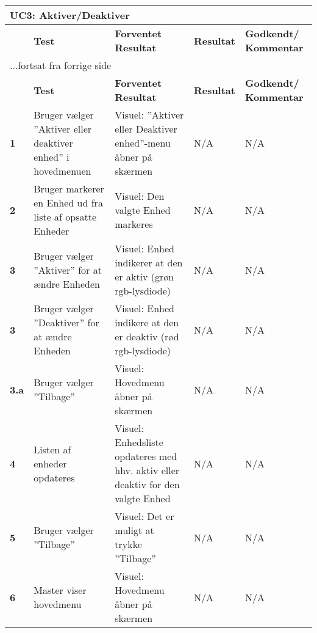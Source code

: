 \begin{center}
\begin{longtable}{|p{}|p{}|p{}|p{}|p{}|} %
\hline
\multicolumn{5}{|l|}{\textbf{UC3: Aktiver/Deaktiver}} \\ \hline
\multicolumn{1}{|c|}{} &
\textbf{Test} &
\textbf{Forventet \newline Resultat} &
\textbf{Resultat} &
\textbf{Godkendt/ \newline Kommentar} \\ \hline 
\endfirsthead

\multicolumn{5}{l}{...fortsat fra forrige side} \\ \hline 
\multicolumn{1}{|c|}{} &
\textbf{Test} &
\textbf{Forventet \newline Resultat} &
\textbf{Resultat} &
\textbf{Godkendt/ \newline Kommentar} \\ \hline 
\endhead

\textbf{1}	&Bruger vælger ''Aktiver eller deaktiver enhed'' i hovedmenuen
			&Visuel: ''Aktiver eller Deaktiver enhed''-menu åbner på skærmen
			&N/A
			&N/A \\ \hline 
			
\textbf{2}	&Bruger markerer en Enhed ud fra liste af opsatte Enheder
			&Visuel: Den valgte Enhed markeres
			&N/A
			&N/A \\ \hline 

\textbf{3}	&Bruger vælger ''Aktiver'' for at ændre Enheden
			&Visuel: Enhed indikerer at den er aktiv (grøn rgb-lysdiode)
			&N/A
			&N/A \\ \hline 

\textbf{3}	&Bruger vælger ''Deaktiver'' for at ændre Enheden
			&Visuel: Enhed indikere at den er deaktiv (rød rgb-lysdiode)
			&N/A
			&N/A \\ \hline 

\textbf{3.a}	&Bruger vælger ''Tilbage'' 
			&Visuel: Hovedmenu åbner på skærmen
			&N/A
			&N/A \\ \hline 		
			
\textbf{4}	&Listen af enheder opdateres		 
			&Visuel: Enhedsliste opdateres med hhv. aktiv eller deaktiv for den valgte Enhed
			&N/A
			&N/A \\ \hline 

\textbf{5}	&Bruger vælger ''Tilbage''
			&Visuel: Det er muligt at trykke ''Tilbage''
			&N/A
			&N/A \\ \hline 
			
\textbf{6}	&Master viser hovedmenu
			&Visuel: Hovedmenu åbner på skærmen
			&N/A
			&N/A \\ \hline 
			
\end{longtable}
	\label{ATUC3} 
\end{center} 